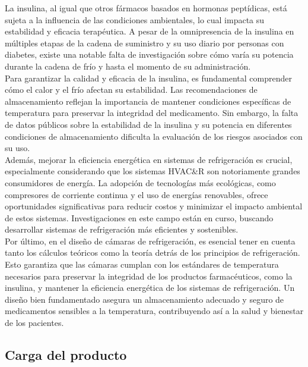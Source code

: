 La insulina, al igual que otros fármacos basados en hormonas peptídicas, está sujeta a la influencia de las condiciones ambientales, lo cual impacta su estabilidad y eficacia terapéutica. A pesar de la omnipresencia de la insulina en múltiples etapas de la cadena de suministro y su uso diario por personas con diabetes, existe una notable falta de investigación sobre cómo varía su potencia durante la cadena de frío y hasta el momento de su administración.\\
Para garantizar la calidad y eficacia de la insulina, es fundamental comprender cómo el calor y el frío afectan su estabilidad. Las recomendaciones de almacenamiento reflejan la importancia de mantener condiciones específicas de temperatura para preservar la integridad del medicamento. Sin embargo, la falta de datos públicos sobre la estabilidad de la insulina y su potencia en diferentes condiciones de almacenamiento dificulta la evaluación de los riesgos asociados con su uso.  \textcolor{white}{ } \cite{heinemann-2020}\\
 Además, mejorar la eficiencia energética en sistemas de refrigeración es crucial, especialmente considerando que los sistemas HVAC\&R son notoriamente grandes consumidores de energía. La adopción de tecnologías más ecológicas, como compresores de corriente continua y el uso de energías renovables, ofrece oportunidades significativas para reducir costos y minimizar el impacto ambiental de estos sistemas. Investigaciones en este campo están en curso, buscando desarrollar sistemas de refrigeración más eficientes y sostenibles.\\ 
 Por último, en el diseño de cámaras de refrigeración, es esencial tener en cuenta tanto los cálculos teóricos como la teoría detrás de los principios de refrigeración. Esto garantiza que las cámaras cumplan con los estándares de temperatura necesarios para preservar la integridad de los productos farmacéuticos, como la insulina, y mantener la eficiencia energética de los sistemas de refrigeración. Un diseño bien fundamentado asegura un almacenamiento adecuado y seguro de medicamentos sensibles a la temperatura, contribuyendo así a la salud y bienestar de los pacientes. \cite{parise-2005}


	\subsection{Carga del producto }	

